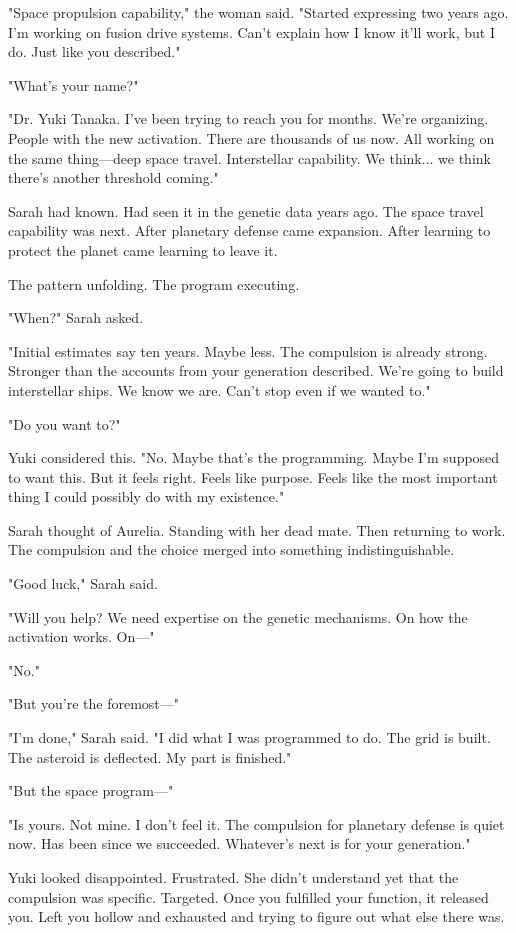 "Space propulsion capability," the woman said. "Started expressing two years ago. I'm working on fusion drive systems. Can't explain how I know it'll work, but I do. Just like you described."

"What's your name?"

"Dr. Yuki Tanaka. I've been trying to reach you for months. We're organizing. People with the new activation. There are thousands of us now. All working on the same thing—deep space travel. Interstellar capability. We think... we think there's another threshold coming."

Sarah had known. Had seen it in the genetic data years ago. The space travel capability was next. After planetary defense came expansion. After learning to protect the planet came learning to leave it.

The pattern unfolding. The program executing.

"When?" Sarah asked.

"Initial estimates say ten years. Maybe less. The compulsion is already strong. Stronger than the accounts from your generation described. We're going to build interstellar ships. We know we are. Can't stop even if we wanted to."

"Do you want to?"

Yuki considered this. "No. Maybe that's the programming. Maybe I'm supposed to want this. But it feels right. Feels like purpose. Feels like the most important thing I could possibly do with my existence."

Sarah thought of Aurelia. Standing with her dead mate. Then returning to work. The compulsion and the choice merged into something indistinguishable.

"Good luck," Sarah said.

"Will you help? We need expertise on the genetic mechanisms. On how the activation works. On—"

"No."

"But you're the foremost—"

"I'm done," Sarah said. "I did what I was programmed to do. The grid is built. The asteroid is deflected. My part is finished."

"But the space program—"

"Is yours. Not mine. I don't feel it. The compulsion for planetary defense is quiet now. Has been since we succeeded. Whatever's next is for your generation."

Yuki looked disappointed. Frustrated. She didn't understand yet that the compulsion was specific. Targeted. Once you fulfilled your function, it released you. Left you hollow and exhausted and trying to figure out what else there was.

